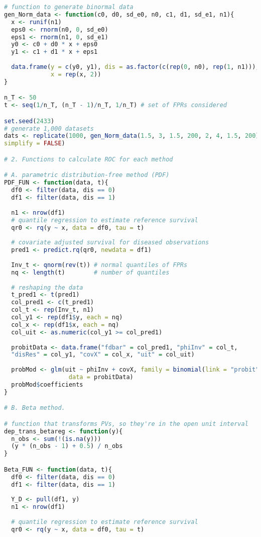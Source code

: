 \documentclass{article}
\begin{document}
\begin{lstlisting}[language=R]
# function to generate binormal data
gen_Norm_data <- function(c0, d0, sd_e0, n0, c1, d1, sd_e1, n1){
  x <- runif(n1)
  eps0 <- rnorm(n0, 0, sd_e0)
  eps1 <- rnorm(n1, 0, sd_e1)
  y0 <- c0 + d0 * x + eps0
  y1 <- c1 + d1 * x + eps1
  
  data.frame(y = c(y0, y1), dis = as.factor(c(rep(0, n0), rep(1, n1))),
             x = rep(x, 2))
}

n_T <- 50
t <- seq(1/n_T, (n_T - 1)/n_T, 1/n_T) # set of FPRs considered

set.seed(2433)
# generate 1,000 datasets
dats <- replicate(1000, gen_Norm_data(1.5, 3, 1.5, 200, 2, 4, 1.5, 200), 
simplify = FALSE)

# 2. Functions to calculate ROC for each method

# A. parametric distribution-free method (PDF)
PDF_FUN <- function(data, t){
  df0 <- filter(data, dis == 0)
  df1 <- filter(data, dis == 1)
  
  n1 <- nrow(df1)
  # quantile regression to estimate reference survival
  qr0 <- rq(y ~ x, data = df0, tau = t) 
  
  # covariate adjusted survival for diseased observations
  pred1 <- predict.rq(qr0, newdata = df1)
  
  Inv_t <- qnorm(rev(t)) # normal quantiles of FPRs
  nq <- length(t)        # number of quantiles
  
  # reshaping the data
  t_pred1 <- t(pred1)
  col_pred1 <- c(t_pred1)
  col_t <- rep(Inv_t, n1)
  col_y1 <- rep(df1$y, each = nq)
  col_x <- rep(df1$x, each = nq)
  col_uit <- as.numeric(col_y1 >= col_pred1)
  
  probitData <- data.frame("fdbar" = col_pred1, "phiInv" = col_t, 
  "disRes" = col_y1, "covX" = col_x, "uit" = col_uit)
  
  probMod <- glm(uit ~ phiInv + covX, family = binomial(link = "probit"), 
                  data = probitData)
  probMod$coefficients
}

# B. Beta method.

# function that transforms PVs, so they're in the open unit interval
dep_trans_betareg <- function(y){
  n_obs <- sum(!(is.na(y)))
  (y * (n_obs - 1) + 0.5) / n_obs
}

Beta_FUN <- function(data, t){
  df0 <- filter(data, dis == 0)
  df1 <- filter(data, dis == 1)
  
  Y_D <- pull(df1, y)
  n1 <- nrow(df1)
  
  # quantile regression to estimate reference survival
  qr0 <- rq(y ~ x, data = df0, tau = t) 
  

\end{lstlisting}
\end{document}
